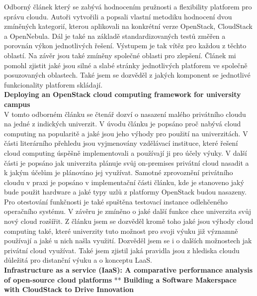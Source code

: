 \documentclass[twoside, 12pt]{article}
\begin{document}
Odborný článek který se zabývá hodnocením pružnosti a flexibility platforem pro správu cloudu. Autoři vytvořili a popsali vlastní metodiku hodnocení dvou zmíněných kategorií, kterou aplikovali na konkrétní verze OpenStack, CloudStack a OpenNebula. Dál je také na základě standardizovaných testů změřen a porovnán výkon jednotlivých řešení. Výstupem je tak vítěz pro každou z těchto oblastí. Na závěr jsou také zmíněny společné oblasti pro zlepšení. \cite{analysis} Článek mi pomohl zjistit jaké jsou silné a slabé stránky jednotlivých platforem ve společně posuzovaných oblastech. Také jsem se dozvěděl z jakých komponent se jednotlivé funkcionality platforem skládají.\\
\textbf{Deploying an OpenStack cloud computing framework for university campus}\\
V tomto odborném článku se čtenář dozví o nasazení malého privátního cloudu na jedné z indických univerzit. V úvodu článku je popsáno proč nabývá cloud computing na popularitě a jaké jsou jeho výhody pro použití na univerzitách. V části literárního přehledu jsou vyjmenovány vzdělávací instituce, které řešení cloud computing úspěšně implementovali a používají ji pro účely výuky. V další části je popsáno jak univerzita plánuje svůj on-premises privátní cloud nasadit a k jakým účelům je plánováno jej využívat. Samotné zprovoznění privátního cloudu v praxi je popsáno v implementační části článku, kde je stanoveno jaký bude použit hardware a jaké typy uzlů z platformy OpenStack budou nasazeny. Pro otestování funkčnosti je také spuštěna testovací instance odlehčeného operačního systému. V závěru je zmíněno o jaké další funkce chce univerzita svůj nový cloud rozšířit. \cite{india} Z článku jsem se dozvěděl kromě toho jaké jsou výhody cloud computing také, které univerzity tuto možnost pro svoji výuku již významně používají a jaké u nich našla využití. Dozvěděl jsem se i o dalších možnostech jak privátní cloud využívat. Také jsem zjistil jaká pravidla jsou z hlediska cloudu důležitá pro distanční výuku a o konceptu LaaS.\\
\textbf{}
\textbf{Infrastructure as a service (IaaS): A comparative performance analysis of open-source cloud platforms}
*\cite{comparison}*
\textbf{Building a Software Makerspace with CloudStack to Drive Innovation}\\
\end{document}
